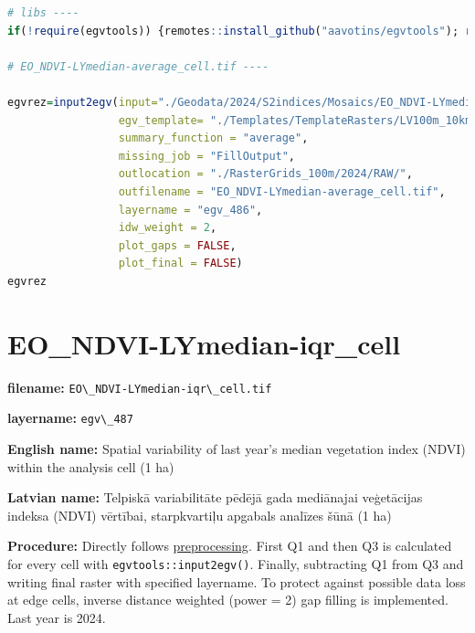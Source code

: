 \documentclass[
]{book}
\newcommand{\passthrough}[1]{#1}
\begin{document}
\begin{lstlisting}[language=R]
# libs ----
if(!require(egvtools)) {remotes::install_github("aavotins/egvtools"); require(egvtools)}

# EO_NDVI-LYmedian-average_cell.tif ----

egvrez=input2egv(input="./Geodata/2024/S2indices/Mosaics/EO_NDVI-LYmedian.tif",
                 egv_template= "./Templates/TemplateRasters/LV100m_10km.tif",
                 summary_function = "average",
                 missing_job = "FillOutput",
                 outlocation = "./RasterGrids_100m/2024/RAW/",
                 outfilename = "EO_NDVI-LYmedian-average_cell.tif",
                 layername = "egv_486",
                 idw_weight = 2,
                 plot_gaps = FALSE,
                 plot_final = FALSE)
egvrez
\end{lstlisting}

\section{EO\_NDVI-LYmedian-iqr\_cell}\label{ch06.487}

\textbf{filename:} \passthrough{\lstinline!EO\_NDVI-LYmedian-iqr\_cell.tif!}

\textbf{layername:} \passthrough{\lstinline!egv\_487!}

\textbf{English name:} Spatial variability of last year's median vegetation index (NDVI) within the analysis cell (1 ha)

\textbf{Latvian name:} Telpiskā variabilitāte pēdējā gada mediānajai veģetācijas indeksa (NDVI) vērtībai, starpkvartiļu apgabals analīzes šūnā (1 ha)

\textbf{Procedure:} Directly follows \hyperref[Ch04.13]{preprocessing}. First Q1 and then Q3
is calculated for every cell with \passthrough{\lstinline!egvtools::input2egv()!}. Finally, subtracting
Q1 from Q3 and writing final raster with specified layername. To protect against possible data loss at edge cells,
inverse distance weighted (power = 2) gap filling is implemented. Last year is 2024.
\end{document}
